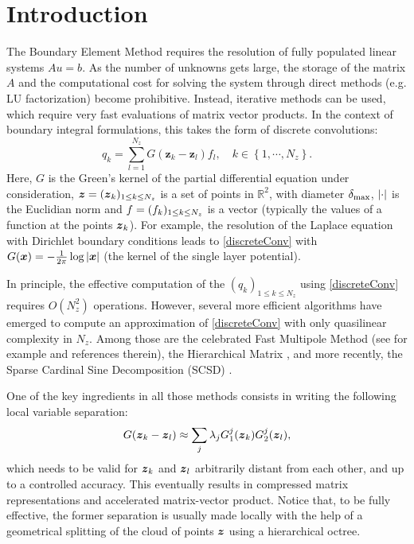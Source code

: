 \documentclass{article}
\begin{document}
\section*{Introduction}
The Boundary Element Method requires the resolution of fully populated linear systems $Au = b$. As the number of unknowns gets large, the storage of the matrix $A$ and the computational cost for solving the system through direct methods (e.g. LU factorization) become prohibitive. Instead, iterative methods can be used, which require very fast evaluations of matrix vector products. In the context of boundary integral formulations, this takes the form of discrete convolutions:
\begin{equation}
	q_k = \sum_{l=1}^{N_z} G(\boldsymbol{z}_k - \boldsymbol{z}_l) f_l, \quad k \in \left\{1, \cdots, N_z\right\}.
	\label{discreteConv}					
\end{equation}
Here, $G$ is the Green's kernel of the partial differential equation under consideration, $\boldsymbol{z} = (\boldsymbol{z}_{k})_{1 \leq k \leq N_z}$  is a set of points in $\mathbb{R}^2$, with diameter $\delta_{\max}$, $\left\lvert \cdot \right\rvert$ is the Euclidian norm and $f = (f_{k})_{1 \leq k \leq N_z}$ is a vector (typically the values of a function at the points $\boldsymbol{z}_k$). For example, the resolution of the Laplace equation with Dirichlet boundary conditions leads to \eqref{discreteConv} with $G(\boldsymbol{x}) = -\frac{1}{2\pi}\log \left\lvert \boldsymbol{x} \right\rvert$ (the kernel of the single layer potential). 

In principle, the effective computation of the $(q_k)_{1 \leq k\leq N_z}$ using \eqref{discreteConv} requires $O(N_z^2)$ operations. However, several more efficient algorithms have emerged to compute an approximation of \eqref{discreteConv} with only quasilinear complexity in $N_z$. Among those are the celebrated Fast Multipole Method (see for example \cite{greengard1988rapid,rokhlin1990rapid, rokhlin1993diagonal, coifman1993fast, cheng1999fast} and references therein), the Hierarchical Matrix \cite{borm2003introduction}, and more recently, the Sparse Cardinal Sine Decomposition (SCSD) \cite{Alouges2015}.

One of the key ingredients in all those methods consists in writing the following local variable separation:
\[G(\boldsymbol{z}_k- \boldsymbol{z}_l) \approx \sum_j \lambda_j G^j_1(\boldsymbol{z}_k)G^j_2(\boldsymbol{z}_l),\] 
which needs to be valid for $\boldsymbol{z}_k$ and $\boldsymbol{z}_l$ arbitrarily distant from each other, and up to a controlled accuracy. This eventually results in compressed matrix representations and accelerated matrix-vector product. Notice that, to be fully effective, the former separation is usually made locally with the help of a geometrical splitting of the cloud of points $\boldsymbol{z}$ using a hierarchical octree.
\end{document}
